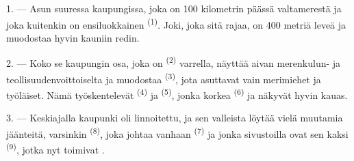 %
%

\VUsaut{2.0mm}
\VUsaut{3.0mm}
\VUfilet{16mm}
\VUsaut{5.6mm}
\VUsaut{1.4mm}
\VUsaut{2.2mm}

\VUsaut{3.0mm}

1. --- Asun suuressa kaupungissa, joka on 100 kilometrin päässä valtamerestä ja
joka kuitenkin on ensiluokkainen  \textsuperscript{(1)}. Joki,
joka sitä rajaa, on 400 metriä leveä ja muodostaa hyvin kauniin redin.

2. --- Koko se kaupungin osa, joka on 
\textsuperscript{(2)} varrella, näyttää aivan merenkulun- ja
teollisuudenvoittoiselta ja muodostaa 
\textsuperscript{(3)}, jota asuttavat vain merimiehet ja työläiset. Nämä
työskentelevät  \textsuperscript{(4)} ja
 \textsuperscript{(5)}, jonka korkea 
\textsuperscript{(6)} ja  näkyvät hyvin kauas.

3. --- Keskiajalla kaupunki oli linnoitettu, ja sen valleista löytää vielä
muutamia jäänteitä, varsinkin  \textsuperscript{(8)}, joka
johtaa vanhaan  \textsuperscript{(7)} ja jonka
sivustoilla ovat sen kaksi  \textsuperscript{(9)}, jotka nyt
toimivat .

